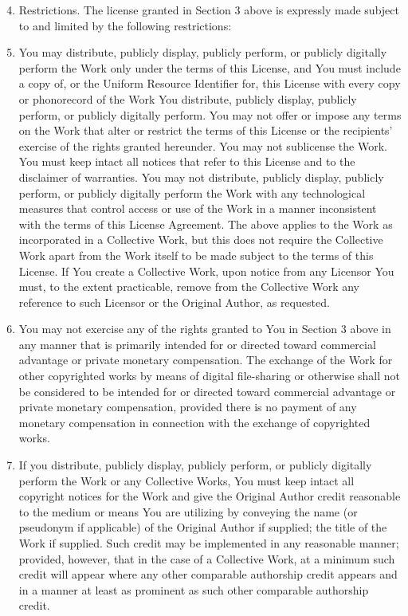 \begin{enumerate}
\setcounter{enumi}{3}
\item
  Restrictions. The license granted in Section 3 above is expressly
  made subject to and limited by the following restrictions:

\item
  You may distribute, publicly display, publicly perform, or publicly
  digitally perform the Work only under the terms of this License,
  and You must include a copy of, or the Uniform Resource Identifier
  for, this License with every copy or phonorecord of the Work You
  distribute, publicly display, publicly perform, or publicly
  digitally perform. You may not offer or impose any terms on the
  Work that alter or restrict the terms of this License or the
  recipients' exercise of the rights granted hereunder. You may not
  sublicense the Work. You must keep intact all notices that refer to
  this License and to the disclaimer of warranties. You may not
  distribute, publicly display, publicly perform, or publicly
  digitally perform the Work with any technological measures that
  control access or use of the Work in a manner inconsistent with the
  terms of this License Agreement. The above applies to the Work as
  incorporated in a Collective Work, but this does not require the
  Collective Work apart from the Work itself to be made subject to
  the terms of this License. If You create a Collective Work, upon
  notice from any Licensor You must, to the extent practicable,
  remove from the Collective Work any reference to such Licensor or
  the Original Author, as requested.

\item
  You may not exercise any of the rights granted to You in Section 3
  above in any manner that is primarily intended for or directed
  toward commercial advantage or private monetary compensation. The
  exchange of the Work for other copyrighted works by means of
  digital file-sharing or otherwise shall not be considered to be
  intended for or directed toward commercial advantage or private
  monetary compensation, provided there is no payment of any monetary
  compensation in connection with the exchange of copyrighted works.

\item
  If you distribute, publicly display, publicly perform, or publicly
  digitally perform the Work or any Collective Works, You must keep
  intact all copyright notices for the Work and give the Original
  Author credit reasonable to the medium or means You are utilizing
  by conveying the name (or pseudonym if applicable) of the Original
  Author if supplied; the title of the Work if supplied. Such credit
  may be implemented in any reasonable manner; provided, however,
  that in the case of a Collective Work, at a minimum such credit
  will appear where any other comparable authorship credit appears
  and in a manner at least as prominent as such other comparable
  authorship credit.


\end{enumerate}
